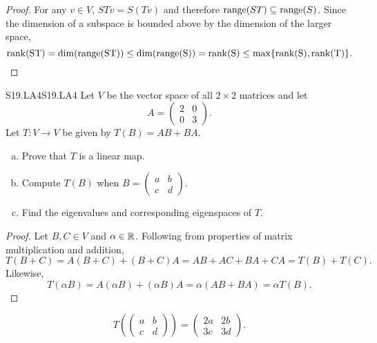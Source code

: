 \documentclass[../../AlgebraQualSolutions.tex]{subfiles}
\begin{document}
	\begin{proof}
		For any $v \in V$, $STv = S(Tv)$ and therefore $\mathrm{range}(ST) \subseteq \mathrm{range}(S)$. Since the dimension of a subspace is bounded above by the dimension of the larger space,
			\[\rm{rank}(ST) = \dim(\mathrm{range}(ST)) \leq \dim(\mathrm{range}(S)) = \rm{rank}(S) \leq \max\{\rm{rank}(S),\rm{rank}(T)\}.\]
	\end{proof}

	\begin{prob}{S19.LA4}{S19.LA4}
		Let $V$ be the vector space of all $2 \times 2$ matrices and let 
			\[A = \begin{pmatrix} 2 & 0\\ 0 & 3 \end{pmatrix}. \]
		Let $T: V \to V$ be given by $T(B) = AB + BA$.

		\begin{enumerate}[(a)]
			\item Prove that $T$ is a linear map.
			\item Compute $T(B)$ when $B = \begin{pmatrix} a & b \\ c & d \end{pmatrix}$.
			\item Find the eigenvalues and corresponding eigenspaces of $T$.
		\end{enumerate}
	\end{prob}

	\begin{proof}
		Let $B,C \in V$ and $\alpha \in \mathbb{R}$. Following from properties of matrix multiplication and addition,
			\[T(B + C) = A(B+C) + (B+C)A = AB + AC + BA + CA = T(B) + T(C).\]
		Likewise,
			\[T(\alpha B) = A(\alpha B) + (\alpha B)A = \alpha(AB +BA) = \alpha T(B).\]
	\end{proof}

	\begin{solution}
		\[T\left(\begin{pmatrix} a & b \\ c & d \end{pmatrix}\right) = \begin{pmatrix} 2a & 2b \\ 3c & 3d \end{pmatrix}.\]
	\end{solution}
\end{document}
